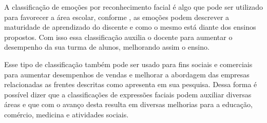 A classificação de emoções por reconhecimento facial é algo que pode ser utilizado para favorecer a área escolar, conforme \cite{sahla:2016}, as emoções podem descrever a maturidade de aprendizado do discente e como o mesmo está diante dos ensinos propostos. Com isso essa classificação auxilia o docente para aumentar o desempenho da sua turma de alunos, melhorando assim o ensino.

Esse tipo de classificação também pode ser usado para fins sociais e comerciais para aumentar desempenhos de vendas e melhorar a abordagem das empresas relacionadas as frentes descritas como apresenta \cite{ozcan:2019} em sua pesquisa. Dessa forma é possível dizer que a classificações de expressões faciais podem auxiliar diversas áreas e que com o avanço desta resulta em diversas melhorias para a educação, comércio, medicina e atividades sociais.